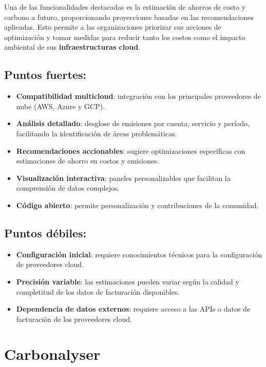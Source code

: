 \documentclass[12pt,a4paper]{report}
\begin{document}
Una de las funcionalidades destacadas es la estimación de ahorros de costo y
carbono a futuro, proporcionando proyecciones basadas en las recomendaciones
aplicadas. Esto permite a las organizaciones priorizar sus acciones de
optimización y tomar medidas para reducir tanto los costos como el impacto
ambiental de sus \textbf{infraestructuras cloud}.

\subsection*{Puntos fuertes:}

\begin{itemize}
  \item \textbf{Compatibilidad multicloud}: integración con los principales proveedores de nube (AWS, Azure y GCP).
  \item \textbf{Análisis detallado}: desglose de emisiones por cuenta, servicio y período, facilitando la identificación de áreas problemáticas.
  \item \textbf{Recomendaciones accionables}: sugiere optimizaciones específicas con estimaciones de ahorro en costos y emisiones.
  \item \textbf{Visualización interactiva}: paneles personalizables que facilitan la comprensión de datos complejos.
  \item \textbf{Código abierto}: permite personalización y contribuciones de la comunidad.
\end{itemize}

\subsection*{Puntos débiles:}

\begin{itemize}
  \item \textbf{Configuración inicial}: requiere conocimientos técnicos para la configuración de proveedores cloud.
  \item \textbf{Precisión variable}: las estimaciones pueden variar según la calidad y completitud de los datos de facturación disponibles.
  \item \textbf{Dependencia de datos externos}: requiere acceso a las APIs o datos de facturación de los proveedores cloud.
\end{itemize}

\section*{Carbonalyser}
\end{document}

